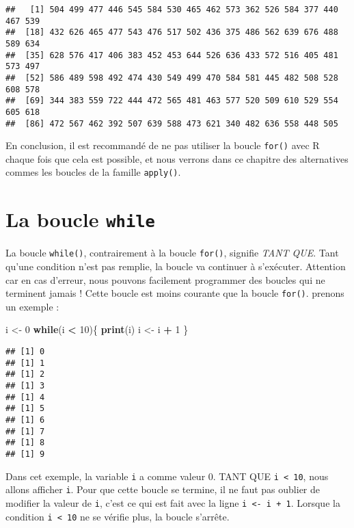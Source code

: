 \documentclass[]{book}
\newenvironment{Shaded}{\begin{snugshade}}{\end{snugshade}}
\newcommand{\KeywordTok}[1]{\textcolor[rgb]{0.13,0.29,0.53}{\textbf{#1}}}
\newcommand{\DecValTok}[1]{\textcolor[rgb]{0.00,0.00,0.81}{#1}}
\newcommand{\StringTok}[1]{\textcolor[rgb]{0.31,0.60,0.02}{#1}}
\newcommand{\ControlFlowTok}[1]{\textcolor[rgb]{0.13,0.29,0.53}{\textbf{#1}}}
\newcommand{\OperatorTok}[1]{\textcolor[rgb]{0.81,0.36,0.00}{\textbf{#1}}}
\newcommand{\NormalTok}[1]{#1}
\theoremstyle{definition}
\theoremstyle{definition}
\theoremstyle{definition}
\theoremstyle{remark}
\begin{document}
\begin{verbatim}
##   [1] 504 499 477 446 545 584 530 465 462 573 362 526 584 377 440 467 539
##  [18] 432 626 465 477 543 476 517 502 436 375 486 562 639 676 488 589 634
##  [35] 628 576 417 406 383 452 453 644 526 636 433 572 516 405 481 573 497
##  [52] 586 489 598 492 474 430 549 499 470 584 581 445 482 508 528 608 578
##  [69] 344 383 559 722 444 472 565 481 463 577 520 509 610 529 554 605 618
##  [86] 472 567 462 392 507 639 588 473 621 340 482 636 558 448 505
\end{verbatim}

En conclusion, il est recommandé de ne pas utiliser la boucle
\texttt{for()} avec R chaque fois que cela est possible, et nous verrons
dans ce chapitre des alternatives commes les boucles de la famille
\texttt{apply()}.

\hypertarget{l17while}{\section{\texorpdfstring{La boucle
\texttt{while}}{La boucle while}}\label{l17while}}

La boucle \texttt{while()}, contrairement à la boucle \texttt{for()},
signifie \emph{TANT QUE}. Tant qu'une condition n'est pas remplie, la
boucle va continuer à s'exécuter. Attention car en cas d'erreur, nous
pouvons facilement programmer des boucles qui ne terminent jamais !
Cette boucle est moins courante que la boucle \texttt{for()}. prenons un
exemple :

\begin{Shaded}
\begin{Highlighting}[]
\NormalTok{i <-}\StringTok{ }\DecValTok{0}
\ControlFlowTok{while}\NormalTok{(i }\OperatorTok{<}\StringTok{ }\DecValTok{10}\NormalTok{)\{}
  \KeywordTok{print}\NormalTok{(i)}
\NormalTok{  i <-}\StringTok{ }\NormalTok{i }\OperatorTok{+}\StringTok{ }\DecValTok{1}
\NormalTok{\}}
\end{Highlighting}
\end{Shaded}

\begin{verbatim}
## [1] 0
## [1] 1
## [1] 2
## [1] 3
## [1] 4
## [1] 5
## [1] 6
## [1] 7
## [1] 8
## [1] 9
\end{verbatim}

Dans cet exemple, la variable \texttt{i} a comme valeur 0. TANT QUE
\texttt{i\ \textless{}\ 10}, nous allons afficher \texttt{i}. Pour que
cette boucle se termine, il ne faut pas oublier de modifier la valeur de
\texttt{i}, c'est ce qui est fait avec la ligne
\texttt{i\ \textless{}-\ i\ +\ 1}. Lorsque la condition
\texttt{i\ \textless{}\ 10} ne se vérifie plus, la boucle s'arrête.
\end{document}
